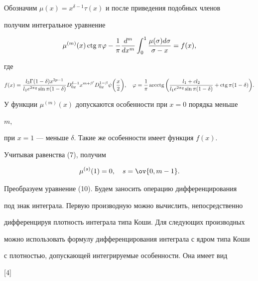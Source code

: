 Обозначим $\mu(x)=x^{\delta-1}\tau(x)$ и после приведения подобных членов 


получим интегральное уравнение 


\begin{equation} 


\mu^{(m)}(x)\ctg\pi\varphi-\frac{1}{\pi}\frac{d^m}{dx^m} 


\int^1_0\frac{\mu(\sigma)d\sigma}{\sigma-x}=f(x), 


\end{equation} 


где 


$$ 


f(x)=\frac{l_3\Gamma(1-\delta)x^{2p-1}} 


{l_1e^{2\pi q}\sin\pi(1-\delta)}D^{\delta-1}_{0x} 


x^{m+\beta'}D^{1-\beta}_{0x}\psi\bigg(\frac{x}{2} \bigg),\quad 


\varphi=\frac{1}{\pi}\arcctg\bigg(\frac{l_1+cl_2} 


{l_1e^{2\pi q}\sin\pi(1-\delta)}+\ctg\pi(1-\delta)\bigg). 


$$ 


 


У функции $\mu^{(m)}(x)$ допускаются особенности при $x=0$ порядка меньше 


$m$, 


при $x=1$ --- меньше $\delta$. Такие же особенности имеет функция $f(x)$. 


 


Учитывая равенства (7), получим 


\begin{equation} 


\mu^{(s)}(1)=0,\quad s=\ov{0,m-1}. 


\end{equation} 


Преобразуем уравнение (10). Будем заносить операцию дифференцирования 


под знак интеграла. Первую производную можно вычислить, непосредственно 


дифференцируя плотность интеграла типа Коши. Для следующих производных 


можно использовать формулу дифференцирования интеграла с ядром типа Коши 


с плотностью, допускающей интегрируемые особенности. Она имеет вид 


[4] 


